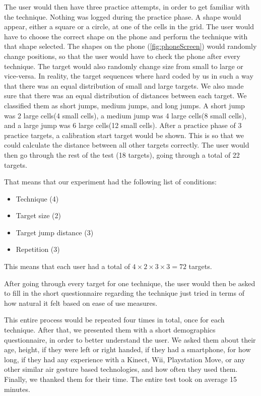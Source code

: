 The user would then have three practice attempts, in order to get familiar with the technique. 
Nothing was logged during the practice phase.
A shape would appear, either a square or a circle, at one of the cells in the grid. 
The user would have to choose the correct shape on the phone and perform the technique with that shape selected. 
The shapes on the phone (\cref{fig:phoneScreen}) would randomly change positions, so that the user would have to check the phone after every technique. 
The target would also randomly change size from small to large or vice-versa. 
In reality, the target sequences where hard coded by us in such a way that there was an equal distribution of small and large targets. 
We also made sure that there was an equal distribution of distances between each target. We classified them as short jumps, medium jumps, and long jumps. 
A short jump was 2 large cells(4 small cells), a medium jump was 4 large cells(8 small cells), and a large jump was 6 large cells(12 small cells).  
After a practice phase of 3 practice targets, a calibration start target would be shown. This is so that we could calculate the distance between all other targets correctly. 
The user would then go through the rest of the test (18 targets), going through a total of 22 targets. 

That means that our experiment had the following list of conditions:
\begin{itemize}
	 \item Technique (4)
	 \item Target size (2)
	 \item Target jump distance (3)
	 \item Repetition (3)
\end{itemize}

This means that each user had a total of $4 \times 2 \times 3 \times 3 = 72 $ targets.

After going through every target for one technique, the user would then be asked to fill in the short questionnaire regarding the technique just tried in terms of how natural it felt based on ease of use measures. 

This entire process would be repeated four times in total, once for each technique. 
After that, we presented them with a short demographics questionnaire, in order to better understand the user. 
We asked them about their age, height, if they were left or right handed, if they had a smartphone, for how long, if they had any experience with a Kinect, Wii, Playstation Move, or any other similar air gesture based technologies, and how often they used them. 
Finally, we thanked them for their time.
The entire test took on average 15 minutes. 